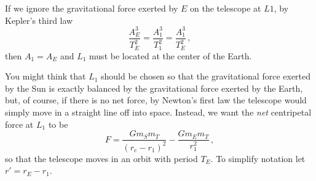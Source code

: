 If we ignore the gravitational force exerted by $E$ on the telescope at $L1$, by Kepler's third law
\[
\frac{A_E^3}{T_E^2} = \frac{A_1^3}{T_1^2}=\frac{A_1^3}{T_E^2}\,,
\]
then $A_1=A_E$ and $L_1$ must be located at the center of the Earth.

You might think that $L_1$ should be chosen so that the gravitational force exerted by the Sun is exactly balanced by the gravitational force exerted by the Earth, but, of course, if there is no net force, by Newton's first law the telescope would simply move in a straight line off into space. Instead, we want the \emph{net} centripetal force at $L_1$ to be
\begin{equation}
F = \frac{Gm_Sm_T}{(r_e-r_1)^2}-\frac{Gm_Em_T}{r_1^2}\,,\label{eqn.force-diff}
\end{equation}
so that the telescope moves in an orbit with period $T_E$. To simplify notation let $r'=r_E-r_1$.

